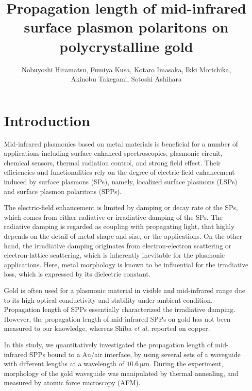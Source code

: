\documentclass[twocolumn,10.5pt,a4]{article}
\begin{document}
\title{Propagation length of mid-infrared surface plasmon polaritons on polycrystalline gold}
\author{Nobuyoshi Hiramatsu, Fumiya Kusa, Kotaro Imasaka,  Ikki Morichika,\\Akinobu Takegami, Satoshi Ashihara}
\maketitle

\section{Introduction}
Mid-infrared plasmonics based on metal materials is beneficial for a number of applications including surface-enhanced spectroscopies\cite{Osawa}\cite{Neubrech}, plasmonic circuit\cite{Ebbesen}, chemical sensors\cite{Matthew}, thermal radiation control\cite{Takahara}, and strong field effect\cite{Kusa2015}. 
Their efficiencies and functionalities rely on the degree of electric-field enhancement induced by surface plasmons (SPs), namely, localized surface plasmons (LSPs) and surface plasmon polaritons (SPPs).

The electric-field enhancement is limited by damping or decay rate of the SPs, which comes from either radiative or irradiative damping of the SPs. 
The radiative damping is regarded as coupling with propagating light, that highly depends on the detail of metal shape and size, or the applications. On the other hand, the irradiative damping originates from electron-electron scattering or electron-lattice scattering, which is inherently inevitable for the plasmonic applications. Here, metal morphology is known to be influential for the irradiative loss, which is expressed by its dielectric constant\cite{Jens}\cite{Hunghua}.

Gold is often used for a plasmonic material in visible and mid-infrared range due to its high optical conductivity and stability under ambient condition. Propagation length of SPPs essentially characterized the irradiative damping. 
However, the propagation length of mid-infrared SPPs on gold has not been measured to our knowledge, whereas Shiba {\it et al.} reported on copper\cite{Shiba}.

In this study, we quantitatively investigated the propagation length of mid-infrared SPPs bound to a Au/air interface, by using several sets of a waveguide with different lengths at a wavelength of $10.6\:\mathrm{\mu m}$. 
During the experiment, morphology of the gold waveguide was manipulated by thermal annealing, and measured by atomic force microscopy (AFM). 
\end{document}
